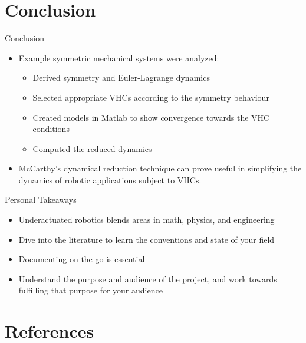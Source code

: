 \documentclass[xcolor=dvipsnames]{beamer}
\begin{document}
\section{Conclusion}
\begin{frame}{Conclusion}
 \begin{itemize}
		\item Example symmetric mechanical systems were analyzed:
  \begin{itemize}
      \item Derived symmetry and Euler-Lagrange dynamics
      \item Selected appropriate VHCs according to the symmetry behaviour
      \item Created models in Matlab to show convergence towards the VHC conditions
      \item Computed the reduced dynamics
  \end{itemize}
            \item McCarthy's dynamical reduction technique can prove useful in simplifying the dynamics of robotic applications  subject to VHCs.
	\end{itemize}
\end{frame}

\begin{frame}{Personal Takeaways}
\begin{itemize}
    \item Underactuated robotics blends areas in math, physics, and engineering
    \item Dive into the literature to learn the conventions and state of your field
    \item Documenting on-the-go is essential
    \item Understand the purpose and audience of the project, and work towards fulfilling that purpose for your audience
\end{itemize}
\end{frame}

\section{References}
\begin{frame}[allowframebreaks,t]{\bibname}
	\AtNextBibliography{\footnotesize}%
	\printbibliography
\end{frame}
\end{document}
